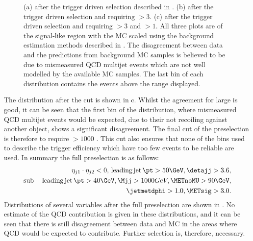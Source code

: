 \begin{figure}
  \caption{(a) \METsig after the trigger driven selection described in . (b) \jetmetdphi after the trigger driven selection and requiring \METsig$>3$. (c) \Mjj after the trigger driven selection and requiring \METsig$>3$ and \jetmetdphi$>1$. All three plots are of the signal-like region with the \ac{MC} scaled using the background estimation methods described in . The disagreement between data and the predictions from background \ac{MC} samples is believed to be due to mismeasured \ac{QCD} multijet events which are not well modelled by the available \ac{MC} samples. The last bin of each distribution contains the events above the range displayed.}
  \label{fig:parkedpresel}
\end{figure}

The \Mjj distribution after the \jetmetdphi cut is shown in c. Whilst the agreement for large \Mjj is good, it can be seen that the first bin of the distribution, where mismeasured \ac{QCD} multijet events would be expected, due to their not recoiling against another object, shows a significant disagreement. The final cut of the preselection is therefore to require \Mjj$>1000$ \GeV. This cut also ensures that none of the bins used to describe the trigger efficiency which have too few events to be reliable are used. In summary the full preselection is as follows:
\begin{equation}
  \label{eq:presel}
  \begin{split}
  \eta_{j1}\cdot\eta_{j2}<0,\,\mathrm{leading\,jet\,}\pt>50 \GeV, \detajj>3.6, \\
  \mathrm{sub-leading\,jet\,}\pt>40 \GeV, \Mjj>1000 GeV, \METnoMU>90\GeV, \\
  \jetmetdphi>1.0, \METsig>3.0.
  \end{split}
\end{equation}
Distributions of several variables after the full preselection are shown in . No estimate of the \ac{QCD} contribution is given in these distributions, and it can be seen that there is still disagreement between data and \ac{MC} in the areas where \ac{QCD} would be expected to contribute. Further selection is, therefore, necessary.

